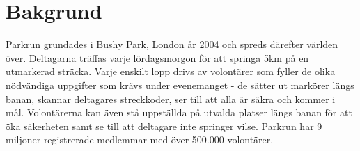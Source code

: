 \section{Bakgrund}






Parkrun grundades i Bushy Park, London år 2004 och spreds därefter världen över. Deltagarna träffas varje lördagsmorgon för att springa 5km på en utmarkerad sträcka. Varje enskilt lopp drivs av volontärer som fyller de olika nödvändiga uppgifter som krävs under evenemanget - de sätter ut markörer längs banan, skannar deltagares streckkoder, ser till att alla är säkra och kommer i mål. Volontärerna kan även stå uppställda på utvalda platser längs banan för att öka säkerheten samt se till att deltagare inte springer vilse. Parkrun har 9 miljoner registrerade medlemmar med över 500.000 volontärer\cite{omOss}.

